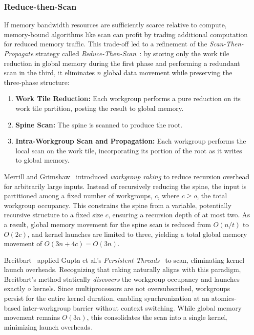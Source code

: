 \documentclass[sigconf]{acmart}
\begin{document}
\subsubsection{Reduce-then-Scan}
If memory bandwidth resources are sufficiently scarce relative to compute, memory-bound algorithms like scan can profit by trading additional computation for reduced memory traffic. This trade-off led to a refinement of the \emph{Scan-Then-Propagate} strategy called \emph{Reduce-Then-Scan}~\cite{10.1145/1375527.1375559, Merrill2009, 10.1109/TPDS.2012.336, 10.5555/2031978.2032029}: by storing only the work tile reduction in global memory during the first phase and performing a redundant scan in the third, it eliminates $n$ global data movement while preserving the three-phase structure:
\begin{enumerate}
  \item \textbf{Work Tile Reduction:} Each workgroup performs a pure reduction on its work tile partition, posting the result to global memory.
  \item \textbf{Spine Scan:} The spine is scanned to produce the root.
  \item \textbf{Intra-Workgroup Scan and Propagation:} Each workgroup performs the local scan on the work tile, incorporating its portion of the root as it writes to global memory.
\end{enumerate}

Merrill and Grimshaw~\cite{Merrill2009} introduced \emph{workgroup raking} to reduce recursion overhead for arbitrarily large inputs. Instead of recursively reducing the spine, the input is partitioned among a fixed number of workgroups, $c$, where $c \geq o$, the total workgroup occupancy. This constrains the spine from a variable, potentially recursive structure to a fixed size $c$, ensuring a recursion depth of at most two. As a result, global memory movement for the spine scan is reduced from $O(n/t)$ to $O(2c)$, and kernel launches are limited to three, yielding a total global memory movement of $O(3n + 4c) = O(3n)$.

Breitbart~\cite{10.5555/2031978.2032029} applied Gupta et al.'s \emph{Persistent-Threads}~\cite{gupta2012} to scan, eliminating kernel launch overheads. Recognizing that raking naturally aligns with this paradigm, Breitbart's method statically \emph{discovers} the workgroup occupancy and launches exactly $o$ kernels. Since multiprocessors are not oversubscribed, workgroups persist for the entire kernel duration, enabling synchronization at an atomics-based inter-workgroup barrier without context switching. While global memory movement remains $O(3n)$, this consolidates the scan into a single kernel, minimizing launch overheads.
\end{document}

